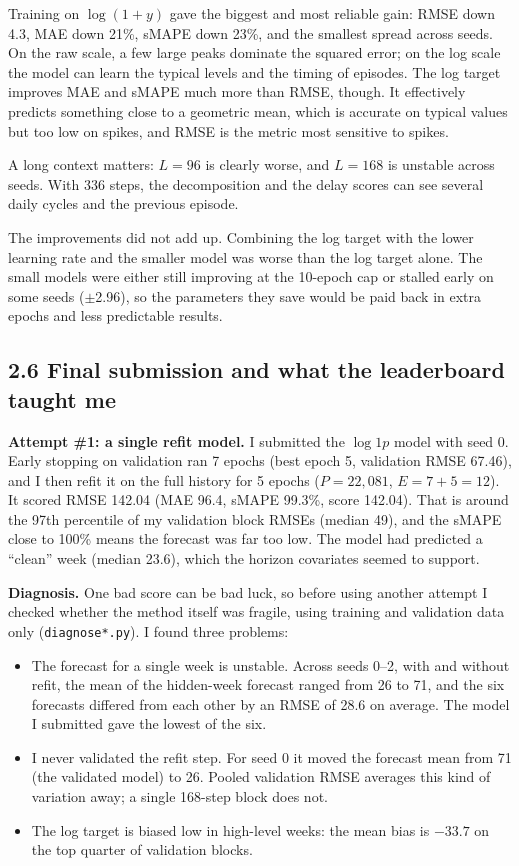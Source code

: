 \documentclass[11pt]{article}
\begin{document}
Training on $\log(1+y)$ gave the biggest and most reliable gain: RMSE down 4.3, MAE down 21\%, sMAPE
down 23\%, and the smallest spread across seeds. On the raw scale, a few large peaks dominate the
squared error; on the log scale the model can learn the typical levels and the timing of episodes.
The log target improves MAE and sMAPE much more than RMSE, though. It effectively predicts
something close to a geometric mean, which is accurate on typical values but too low on spikes,
and RMSE is the metric most sensitive to spikes.

A long context matters: $L=96$ is clearly worse, and $L=168$ is unstable across seeds. With 336
steps, the decomposition and the delay scores can see several daily cycles and the previous
episode.

The improvements did not add up. Combining the log target with the lower learning rate and the
smaller model was worse than the log target alone. The small models were either still improving
at the 10-epoch cap or stalled early on some seeds ($\pm$2.96), so the parameters they save would
be paid back in extra epochs and less predictable results.

\subsection*{2.6 Final submission and what the leaderboard taught me}

\textbf{Attempt \#1: a single refit model.} I submitted the $\log1p$ model with seed 0. Early
stopping on validation ran 7 epochs (best epoch 5, validation RMSE 67.46), and I then refit it on
the full history for 5 epochs ($P=22{,}081$, $E=7+5=12$). It scored RMSE 142.04 (MAE 96.4, sMAPE
99.3\%, score 142.04). That is around the 97th percentile of my validation block RMSEs (median 49),
and the sMAPE close to 100\% means the forecast was far too low. The model had predicted a ``clean''
week (median 23.6), which the horizon covariates seemed to support.

\textbf{Diagnosis.} One bad score can be bad luck, so before using another attempt I checked
whether the method itself was fragile, using training and validation data only
(\texttt{diagnose*.py}). I found three problems:
\begin{itemize}
  \item The forecast for a single week is unstable. Across seeds 0--2, with and without refit, the
  mean of the hidden-week forecast ranged from 26 to 71, and the six forecasts differed from each
  other by an RMSE of 28.6 on average. The model I submitted gave the lowest of the six.
  \item I never validated the refit step. For seed 0 it moved the forecast mean from 71 (the
  validated model) to 26. Pooled validation RMSE averages this kind of variation away; a single
  168-step block does not.
  \item The log target is biased low in high-level weeks: the mean bias is $-33.7$ on the top
  quarter of validation blocks.
\end{itemize}
\end{document}
